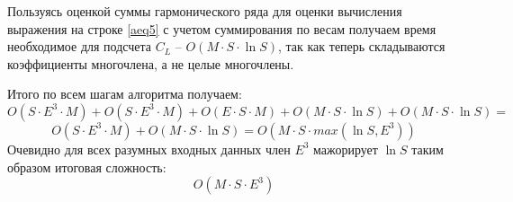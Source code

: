 Пользуясь оценкой суммы гармонического ряда для оценки вычисления выражения на строке \ref{aeq5} с учетом суммирования по весам получаем
время необходимое для подсчета $C_L$ -- $O(M \cdot S \cdot \ln S)$, так как теперь складываются 
коэффициенты многочлена, а не целые многочлены.

Итого по всем шагам алгоритма получаем:
\[
O(S \cdot E^3 \cdot M) + O(S \cdot E^3 \cdot M) + 
O(E \cdot S \cdot M) + O(M \cdot S \cdot \ln S) + O(M \cdot S \cdot \ln S)= 
\]
\[
O(S \cdot E^3 \cdot M) + O(M \cdot S \cdot \ln S) = O(M \cdot S \cdot max(\ln S, E^3))
\]
Очевидно для всех разумных входных данных член $E^3$ мажорирует $\ln S$ таким образом итоговая сложность:
\[
  O(M \cdot S \cdot E^3)
\]
